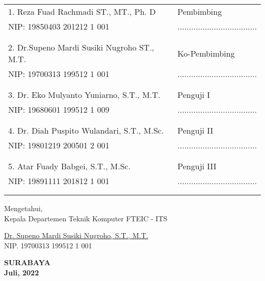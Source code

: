    \noindent
    \begin{tabularx}{\textwidth}{X l}
      1. Reza Fuad Rachmadi ST., MT., Ph. D          & Pembimbing \\
      NIP: 19850403 201212 1 001        & ................................... \\
      &  \\
      &  \\
      2. Dr.Supeno Mardi Susiki Nugroho ST., M.T.     & Ko-Pembimbing \\
      NIP: 19700313 199512 1 001        & ................................... \\
      &  \\
      &  \\
      3. Dr. Eko Mulyanto Yuniarno, S.T., M.T.     & Penguji I \\
      NIP: 19680601 199512 1 009 & ................................... \\
      &  \\
      &  \\
      4. Dr. Diah Puspito Wulandari, S.T., M.Sc. & Penguji II \\
      NIP: 19801219 200501 2 001  & ................................... \\
      &  \\
      &  \\
      5.  Atar Fuady Babgei, S.T., M.Sc.   & Penguji III \\
      NIP: 19891111 201812 1 001 & ................................... \\
      &  \\
      &  \\
    \end{tabularx}
  \endgroup


  \begin{center}
    Mengetahui, \\
    Kepala Departemen Teknik Komputer FTEIC - ITS\\

    \vspace{8ex}

    \underline{Dr. Supeno Mardi Susiki Nugroho, S.T., M.T.} \\
    NIP. 19700313 199512 1 001
  \end{center}

  \begin{center}
    \textbf{SURABAYA\\Juli, 2022}
  \end{center}
\endgroup